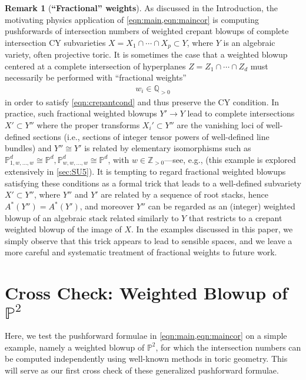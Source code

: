 \documentclass[11pt,oneside,english]{article}
\numberwithin{equation}{section}
\theoremstyle{definition}
\newtheorem{remark}{Remark}[theorem]
\begin{document}
\begin{remark}[\bf{``Fractional'' weights}] \label{rem:frac}
As discussed in the Introduction, the motivating physics application of \cref{eqn:main,eqn:maincor} is computing pushforwards of intersection numbers of weighted crepant blowups of complete intersection CY subvarieties $X= X_1 \cap \cdots \cap X_p \subset Y$, where $Y$ is an algebraic variety, often projective toric. It is sometimes the case that a weighted blowup centered at a complete intersection of hyperplanes $Z = Z_1 \cap \cdots \cap Z_d$ must necessarily be performed with ``fractional weights'' 
	\begin{align}
		w_i \in \mathbb Q_{>0}
	\end{align}
in order to satisfy \cref{eqn:crepantcond} and thus preserve the CY condition. In practice, such fractional weighted blowups $Y' \rightarrow Y$ lead to complete intersections $X' \subset Y''$ where the proper transforms $X_i' \subset Y''$ are the vanishing loci of well-defined sections (i.e., sections of integer tensor powers of well-defined line bundles) and $Y'' \cong Y'$ is related by elementary isomorphisms such as $\mathbb P_{1,w,\dots,w}^d \cong \mathbb P^d,\mathbb P^d_{w,w, \dots, w} \cong \mathbb P^d$, with $w\in \mathbb Z_{>0}$---see, e.g., \cite[Section 5.5]{Esole:2014hya} (this example is explored extensively in \cref{sec:SU5}). It is tempting to regard fractional weighted blowups satisfying these conditions as a formal trick that leads to a well-defined subvariety $X' \subset Y''$, where $Y''$ and $Y'$ are related by a sequence of root stacks, hence $A^*(Y'') = A^*(Y')$, and moreover $Y''$ can be regarded as an (integer) weighted blowup of an algebraic stack related similarly to $Y$ that restricts to a crepant weighted blowup of the image of $X$. In the examples discussed in this paper, we simply observe that this trick appears to lead to sensible spaces, and we leave a more careful and systematic treatment of fractional weights to future work. 


\end{remark}

\section{Cross Check: Weighted Blowup of $\mathbb P^2$}

\label{sec:P2}

Here, we test the pushforward formulae in \cref{eqn:main,eqn:maincor} on a simple example, namely a weighted blowup of $\mathbb P^2$, for which the intersection numbers can be computed independently using well-known methods in toric geometry. This will serve as our first cross check of these generalized pushforward formulae.
\end{document}
